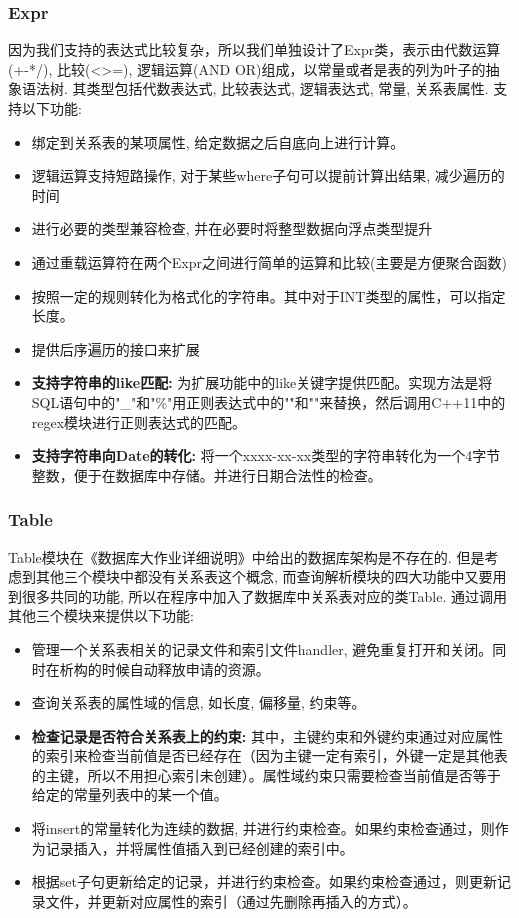 \documentclass[11pt,UTF8]{report}
\begin{document}
\subsubsection{Expr}
因为我们支持的表达式比较复杂，所以我们单独设计了Expr类，表示由代数运算(+-*/), 比较(<>=), 逻辑运算(AND OR)组成，以常量或者是表的列为叶子的抽象语法树. 其类型包括代数表达式, 比较表达式, 逻辑表达式, 常量, 关系表属性. 支持以下功能:
\begin{itemize}
	\item 绑定到关系表的某项属性, 给定数据之后自底向上进行计算。
	\item 逻辑运算支持短路操作, 对于某些where子句可以提前计算出结果, 减少遍历的时间
	\item 进行必要的类型兼容检查, 并在必要时将整型数据向浮点类型提升
	\item 通过重载运算符在两个Expr之间进行简单的运算和比较(主要是方便聚合函数)
	\item 按照一定的规则转化为格式化的字符串。其中对于INT类型的属性，可以指定长度。
	\item 提供后序遍历的接口来扩展
	\item \textbf{支持字符串的like匹配:} 为扩展功能中的like关键字提供匹配。实现方法是将SQL语句中的"\_"和"\%"用正则表达式中的"\."和"\.\*"来替换，然后调用C++11中的regex模块进行正则表达式的匹配。
	\item \textbf{支持字符串向Date的转化:} 将一个xxxx-xx-xx类型的字符串转化为一个4字节整数，便于在数据库中存储。并进行日期合法性的检查。
\end{itemize}

\subsubsection{Table}
Table模块在《数据库大作业详细说明》中给出的数据库架构是不存在的. 但是考虑到其他三个模块中都没有关系表这个概念, 而查询解析模块的四大功能中又要用到很多共同的功能, 所以在程序中加入了数据库中关系表对应的类Table. 通过调用其他三个模块来提供以下功能:
\begin{itemize}
	\item 管理一个关系表相关的记录文件和索引文件handler, 避免重复打开和关闭。同时在析构的时候自动释放申请的资源。
	\item 查询关系表的属性域的信息, 如长度, 偏移量, 约束等。
	\item \textbf{检查记录是否符合关系表上的约束:} 其中，主键约束和外键约束通过对应属性的索引来检查当前值是否已经存在（因为主键一定有索引，外键一定是其他表的主键，所以不用担心索引未创建）。属性域约束只需要检查当前值是否等于给定的常量列表中的某一个值。
	\item 将insert的常量转化为连续的数据, 并进行约束检查。如果约束检查通过，则作为记录插入，并将属性值插入到已经创建的索引中。
	\item 根据set子句更新给定的记录，并进行约束检查。如果约束检查通过，则更新记录文件，并更新对应属性的索引（通过先删除再插入的方式）。
\end{itemize}
\end{document}

